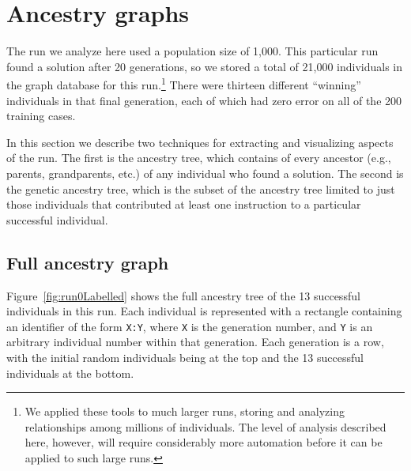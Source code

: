 \documentclass[graybox]{svmult}
\begin{document}
\section{Ancestry graphs}
\label{sec:ancestryGraphs}

The run we analyze here used a population size of 1,000. 
This particular run
found a solution after 20 generations, so we stored a total of 21,000 
individuals in the graph database for this run.\footnote{We applied these tools to much larger runs, storing and analyzing relationships among millions of individuals. The level of analysis described here, however, will require considerably more automation before it can be applied to such large runs.} There were thirteen different
``winning'' individuals in that final generation, each of which had zero
error on all of the 200 training cases.

In this section we describe two techniques for extracting and 
visualizing aspects of the run. The first is the ancestry tree, which 
contains of every ancestor (e.g., parents, grandparents, etc.) of any
individual who found a solution. The second is the genetic ancestry 
tree, which is the subset of the ancestry tree limited to just those 
individuals that contributed at least one instruction to a particular
successful individual.

\subsection{Full ancestry graph}

Figure~\ref{fig:run0Labelled} shows the full ancestry tree of the 13 successful 
individuals in this run. Each individual is represented with a
rectangle containing an identifier of the form \texttt{X:Y}, where \texttt{X}
is the generation number, and \texttt{Y} is an arbitrary individual number
within that generation. Each generation is a row, with the initial random
individuals being at the top and the 13 successful individuals at the bottom.
\end{document}
